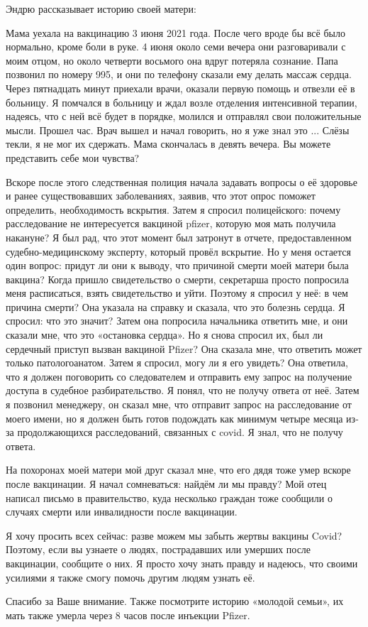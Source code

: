 Эндрю рассказывает историю своей матери:

Мама уехала на вакцинацию 3 июня 2021 года. После чего вроде бы всё было
нормально, кроме боли в руке. 4 июня около семи вечера они разговаривали с моим
отцом, но около четверти восьмого она вдруг потеряла сознание. Папа позвонил по
номеру 995, и они по телефону сказали ему делать массаж сердца. Через пятнадцать
минут приехали врачи, оказали первую помощь и отвезли её в больницу. Я помчался
в больницу и ждал возле отделения интенсивной терапии, надеясь, что с ней всё
будет в порядке, молился и отправлял свои положительные мысли. Прошел час. Врач
вышел и начал говорить, но я уже знал это ... Слёзы текли, я не мог их
сдержать. Мама скончалась в девять вечера. Вы можете представить себе мои
чувства?

Вскоре после этого следственная полиция начала задавать вопросы о её здоровье и
ранее существовавших заболеваниях, заявив, что этот опрос поможет определить,
необходимость вскрытия. Затем я спросил полицейского: почему расследование не
интересуется вакциной pfizer, которую моя мать получила накануне? Я был рад, что
этот момент был затронут в отчете, предоставленном судебно-медицинскому
эксперту, который провёл вскрытие. Но у меня остается один вопрос: придут ли они
к выводу, что причиной смерти моей матери была вакцина? Когда пришло
свидетельство о смерти, секретарша просто попросила меня расписаться, взять
свидетельство и уйти. Поэтому я спросил у неё: в чем причина смерти? Она указала
на справку и сказала, что это болезнь сердца. Я спросил: что это значит? Затем
она попросила начальника ответить мне, и они сказали мне, что это «остановка
сердца». Но я снова спросил их, был ли сердечный приступ вызван вакциной Pfizer?
Она сказала мне, что ответить может только патологоанатом. Затем я спросил, могу
ли я его увидеть? Она ответила, что я должен поговорить со следователем и
отправить ему запрос на получение доступа в судебное разбирательство. Я понял,
что не получу ответа от неё. Затем я позвонил менеджеру, он сказал мне, что
отправит запрос на расследование от моего имени, но я должен быть готов
подождать как минимум четыре месяца из-за продолжающихся расследований,
связанных с covid. Я знал, что не получу ответа.

На похоронах моей матери мой друг сказал мне, что его дядя тоже умер вскоре
после вакцинации. Я начал сомневаться: найдём ли мы правду? Мой отец написал
письмо в правительство, куда несколько граждан тоже сообщили о случаях смерти
или инвалидности после вакцинации.

Я хочу просить всех сейчас: разве можем мы забыть жертвы вакцины Covid?
Поэтому, если вы узнаете о людях, пострадавших или умерших после вакцинации,
сообщите о них.  Я просто хочу знать правду и надеюсь, что своими усилиями я
также смогу помочь другим людям узнать её.

Спасибо за Ваше внимание. Также посмотрите историю «молодой семьи», их мать
также умерла через 8 часов после инъекции Pfizer.
          
